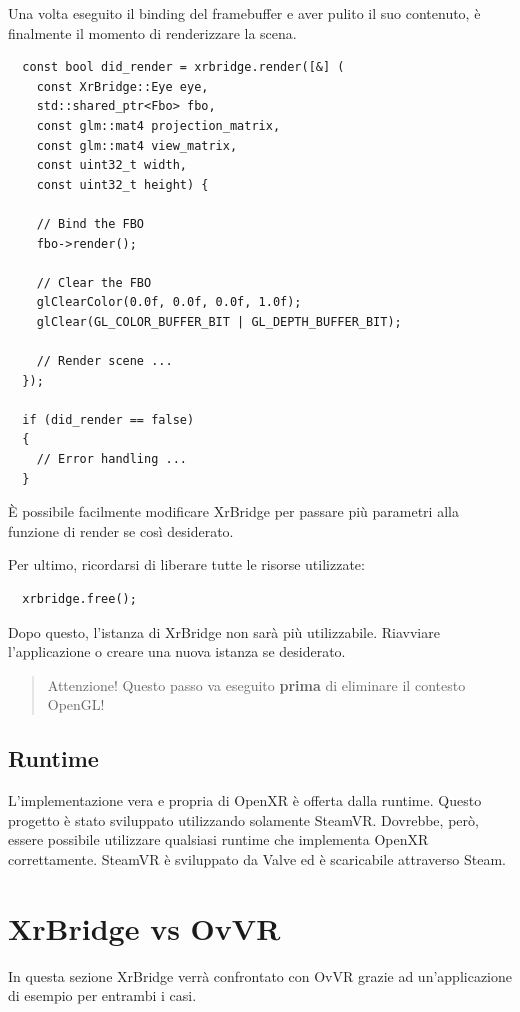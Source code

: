 \documentclass[twoside]{supsistudent}
\begin{document}
Una volta eseguito il binding del framebuffer e aver pulito il suo contenuto, è finalmente il momento di renderizzare la scena.

\begin{verbatim}
  const bool did_render = xrbridge.render([&] (
    const XrBridge::Eye eye,
    std::shared_ptr<Fbo> fbo,
    const glm::mat4 projection_matrix,
    const glm::mat4 view_matrix,
    const uint32_t width,
    const uint32_t height) {

    // Bind the FBO
    fbo->render();

    // Clear the FBO
    glClearColor(0.0f, 0.0f, 0.0f, 1.0f);
    glClear(GL_COLOR_BUFFER_BIT | GL_DEPTH_BUFFER_BIT);

    // Render scene ...
  });

  if (did_render == false)
  {
    // Error handling ...
  }
\end{verbatim}

È possibile facilmente modificare XrBridge per passare più parametri alla funzione di render se così desiderato.

Per ultimo, ricordarsi di liberare tutte le risorse utilizzate:

\begin{verbatim}
  xrbridge.free();
\end{verbatim}

Dopo questo, l'istanza di XrBridge non sarà più utilizzabile. Riavviare l'applicazione o creare una nuova istanza se desiderato.

\begin{quote}
  Attenzione! Questo passo va eseguito \textbf{prima} di eliminare il contesto OpenGL!
\end{quote}

\subsection{Runtime}

L'implementazione vera e propria di OpenXR è offerta dalla runtime. Questo progetto è stato sviluppato utilizzando solamente SteamVR. Dovrebbe, però, essere possibile utilizzare qualsiasi runtime che implementa OpenXR correttamente. SteamVR è sviluppato da Valve ed è scaricabile attraverso Steam.

\section{XrBridge vs OvVR}

In questa sezione XrBridge verrà confrontato con OvVR grazie ad un'applicazione di esempio per entrambi i casi.
\end{document}
